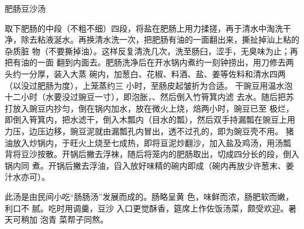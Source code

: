 \begin{recipe}{肥肠豆沙汤}

\ingredients


\preparation

\step 取下肥肠的中段（不粗不细）四段，将盐在肥肠上用力揉搓，再于清水中淘洗干
净，除去粘液涎水。再换清水洗一次，把肥肠有油的一面翻出来，撕扯掉汕上粘的杂质脏
物（不要撕掉油）。这样反复清洗几次，洗至肠臼，涩手，无臭味为止；再把有油的一面
翻到内面去。肥肠洗净后在开水锅内煮约一刻钟捞出，用刀修去两头约一分厚，装入大蒸
碗内，加葱白、花椒、料酒、盐、姜等佐料和清水四两（以没过肥肠为度），上笼蒸约三
小时，至肠皮起皱折为合适。
\step 干豌豆用温水泡十二小时（水要没过豌豆一寸），即泡胀，、然后倒入竹筲箕内滤
去水。随后把苏打放入豌豆内抄匀，倒在锅内加水，放在微火上烧，焙两小时，豌豆已至
极烂，即倒入筲箕内，把水滤干，倒入木瓢内（目水的瓢），然后双手持漏瓢在豌豆上用
力压，边压边移，豌豆泥就由漏瓢孔内冒出，透不过孔的，即为豌豆壳不用。
\step 猪油放入炒锅内，于旺火上烧至七成热，即将亘泥炒翻沙，加入盐及鸡汤，用汤瓢
背将豆沙按散。开锅后撇去浮袜，随后将笼内的肥肠取出，切成四分长的段，倒入锅内同
煮。开锅后撇去浮油，舀入放好味精的碗内即成（碗内再放少许葱末、姜汁水亦可）。

\features

此汤是由民间小吃“肠肠汤”发展而成的。肠略呈黄 色，味鲜而浓，肠肥软而嫩，利口不
腻。吃时用调羹，豆沙 入口更觉酥香，筵席上作佐饭汤菜，颇受欢迎。暑天可稍加 泡青
菜帮子同熬。

\end{recipe}


